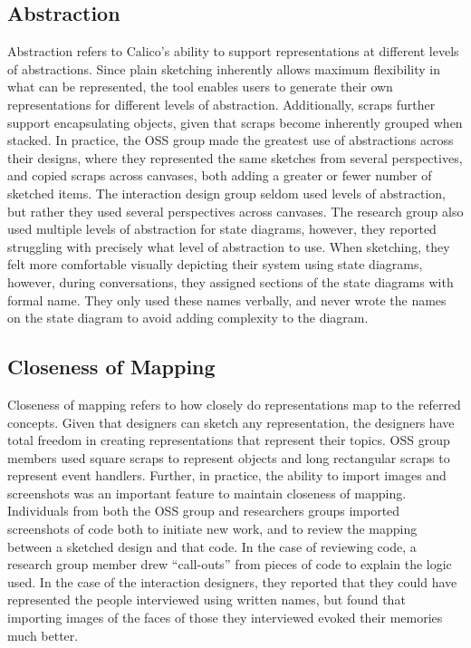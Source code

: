 \subsection{Abstraction}
Abstraction refers to Calico's ability to support representations at different levels of abstractions. Since plain sketching inherently allows maximum flexibility in what can be represented, the tool enables users to generate their own representations for different levels of abstraction. Additionally, scraps further support encapsulating objects, given that scraps become inherently grouped when stacked. In practice, the OSS group made the greatest use of abstractions across their designs, where they represented the same sketches from several perspectives, and copied scraps across canvases, both adding a greater or fewer number of sketched items. The interaction design group seldom used levels of abstraction, but rather they used several perspectives across canvases. The research group also used multiple levels of abstraction for state diagrams, however, they reported struggling with precisely what level of abstraction to use. When sketching, they felt more comfortable visually depicting their system using state diagrams, however, during conversations, they assigned sections of the state diagrams with formal name. They only used these names verbally, and never wrote the names on the state diagram to avoid adding complexity to the diagram.

%

\subsection{Closeness of Mapping}
Closeness of mapping refers to how closely do representations map to the referred concepts. Given that designers can sketch any representation, the designers have total freedom in creating representations that represent their topics. OSS group members used square scraps to represent objects and long rectangular scraps to represent event handlers. Further, in practice, the ability to import images and screenshots was an important feature to maintain closeness of mapping. Individuals from both the OSS group and researchers groups imported screenshots of code both to initiate new work, and to review the mapping between a sketched design and that code. In the case of reviewing code, a research group member drew ``call-outs'' from pieces of code to explain the logic used. In the case of the interaction designers, they reported that they could have represented the people interviewed using written names, but found that importing images of the faces of those they interviewed evoked their memories much better.

